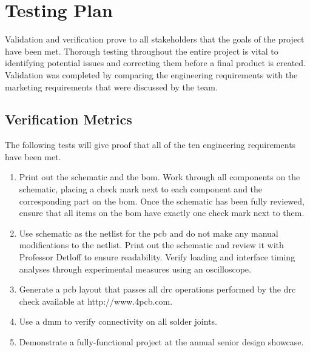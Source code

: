 \newcommand{\testheader}{\textrotate{\textbf{Step}} & \textbf{Action} & \textbf{Expected Result} & \textrotate{\textbf{Pass}} & \textrotate{\textbf{Fail}} & \textrotate{\textbf{N/A}} & \textbf{Comments} \\ \hline}
\newcommand{\testinfo}[2]{\multicolumn{2}{|r|}{\textbf{Test Case Name:}} & \multicolumn{5}{m{11cm}|}{#1} \\ \hline \multicolumn{2}{|r|}{\textbf{Description:}} & \multicolumn{5}{m{11cm}|}{#2} \\ \hline}
\newcommand{\testerinfo}{\multicolumn{2}{|r|}{\textbf{Name of Tester:}} & & \multicolumn{3}{l|}{\textbf{Date:}} & \\ \hline \multicolumn{2}{|r|}{\textbf{HW/SW Version:}} & & \multicolumn{3}{l|}{\textbf{Time:}} & \\ \hline}
\newcommand{\testsetup}[1]{\multicolumn{2}{|r|}{\textbf{Setup:}} & \multicolumn{5}{m{11cm}|}{#1} \\ \hline}
\newcommand{\testtabular}[3]{\begin{tabular}{|m{.25cm}|m{4cm}|m{5cm}|m{.25cm}|m{.25cm}|m{.25cm}|m{3cm}|}\hline\testinfo{#1}{#2}\testerinfo\testsetup{#3}\testheader}

\chapter{Testing Plan}
Validation and verification prove to all stakeholders that the goals of the project have been met.
Thorough testing throughout the entire project is vital to identifying potential issues and correcting them before a final product is created. 
Validation was completed by comparing the engineering requirements with the marketing requirements that were discussed by the team. 

\section{Verification Metrics}
The following tests will give proof that all of the ten engineering requirements have been met.
\begin{enumerate}
	\item Print out the schematic and the \gls{bom}.
Work through all components on the schematic, placing a check mark next to each component and the corresponding part on the \gls{bom}.
Once the schematic has been fully reviewed, ensure that all items on the \gls{bom} have exactly one check mark next to them.
	\item Use schematic as the netlist for the \gls{pcb} and do not make any manual modifications to the netlist.
Print out the schematic and review it with Professor Detloff to ensure readability.
Verify loading and interface timing analyses through experimental measures using an oscilloscope. 
	\item Generate a \gls{pcb} layout that passes all \gls{drc} operations performed by the \gls{drc} check available at http://www.4pcb.com. 
	\item Use a \gls{dmm} to verify connectivity on all solder joints.
	\item Demonstrate a fully-functional project at the annual senior design showcase. 
\end{enumerate}
